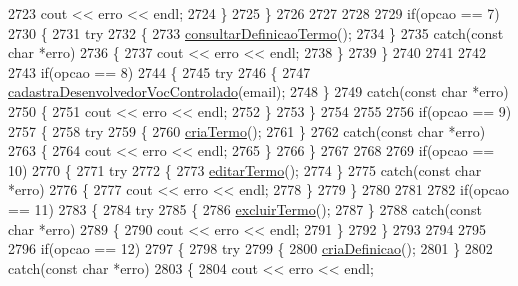 \begin{DoxyCode}
2723       cout << erro << endl;
2724     \}
2725   \}
2726 
2727 
2728 
2729   \textcolor{keywordflow}{if}(opcao == 7)
2730   \{
2731     \textcolor{keywordflow}{try}
2732     \{
2733       \mbox{\hyperlink{class_servico_usuarios_administrador_acc178ea9b5ed289bde27ca853e874962}{consultarDefinicaoTermo}}();
2734     \}
2735     \textcolor{keywordflow}{catch}(\textcolor{keyword}{const} \textcolor{keywordtype}{char} *erro)
2736     \{
2737       cout << erro << endl;
2738     \}
2739   \}
2740 
2741 
2742 
2743   \textcolor{keywordflow}{if}(opcao == 8)
2744   \{
2745     \textcolor{keywordflow}{try}
2746     \{
2747       \mbox{\hyperlink{class_servico_usuarios_administrador_a0a20923a2c556fa62587fac48b6e55da}{cadastraDesenvolvedorVocControlado}}(email);
2748     \}
2749     \textcolor{keywordflow}{catch}(\textcolor{keyword}{const} \textcolor{keywordtype}{char} *erro)
2750     \{
2751       cout << erro << endl;
2752     \}
2753   \}
2754 
2755 
2756   \textcolor{keywordflow}{if}(opcao == 9)
2757   \{
2758     \textcolor{keywordflow}{try}
2759     \{
2760       \mbox{\hyperlink{class_servico_usuarios_administrador_a9002054e8a06338e2a380517b6aeb1f7}{criaTermo}}();
2761     \}
2762     \textcolor{keywordflow}{catch}(\textcolor{keyword}{const} \textcolor{keywordtype}{char} *erro)
2763     \{
2764       cout << erro << endl;
2765     \}
2766   \}
2767 
2768 
2769   \textcolor{keywordflow}{if}(opcao == 10)
2770   \{
2771     \textcolor{keywordflow}{try}
2772     \{
2773       \mbox{\hyperlink{class_servico_usuarios_administrador_a219b135060f3a85d996f506474b99f48}{editarTermo}}();
2774     \}
2775     \textcolor{keywordflow}{catch}(\textcolor{keyword}{const} \textcolor{keywordtype}{char} *erro)
2776     \{
2777       cout << erro << endl;
2778     \}
2779   \}
2780 
2781 
2782   \textcolor{keywordflow}{if}(opcao == 11)
2783   \{
2784     \textcolor{keywordflow}{try}
2785     \{
2786       \mbox{\hyperlink{class_servico_usuarios_administrador_a90abacb7bb051878e6b016d9993733c1}{excluirTermo}}();
2787     \}
2788     \textcolor{keywordflow}{catch}(\textcolor{keyword}{const} \textcolor{keywordtype}{char} *erro)
2789     \{
2790       cout << erro << endl;
2791     \}
2792   \}
2793 
2794 
2795 
2796   \textcolor{keywordflow}{if}(opcao == 12)
2797   \{
2798     \textcolor{keywordflow}{try}
2799     \{
2800       \mbox{\hyperlink{class_servico_usuarios_administrador_a10298cc0f8e8c1b6f44363747bc8de1e}{criaDefinicao}}();
2801     \}
2802     \textcolor{keywordflow}{catch}(\textcolor{keyword}{const} \textcolor{keywordtype}{char} *erro)
2803     \{
2804       cout << erro << endl;

\end{DoxyCode}
